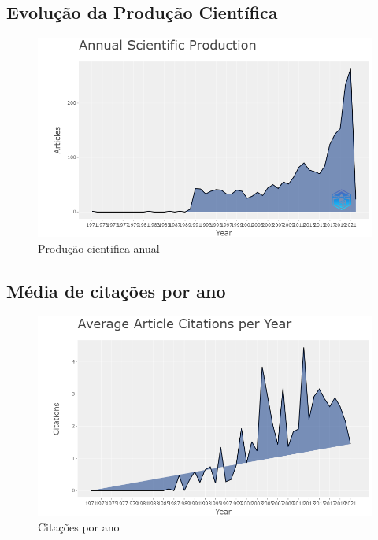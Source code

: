 \subsection{Evolução da Produção Científica}

\begin{figure}
    \centering
    \includegraphics[width=12cm]{experiments/GMalme/AnaliseBibliometrica/ImpactoDeJogosNaTecnologia/Figs/Annual Scientific Production.png}
    \caption{Produção cientifica anual}
    \label{fig:AIJ_produçãoAnual}
\end{figure}


\subsection{Média de citações por ano}

\begin{figure}
    \centering
    \includegraphics[width=12cm]{experiments/GMalme/AnaliseBibliometrica/ImpactoDeJogosNaTecnologia/Figs/Average Citations per Year.png}
    \caption{Citações por ano}
    \label{fig:AIJ_citaçõesAno}
\end{figure}

